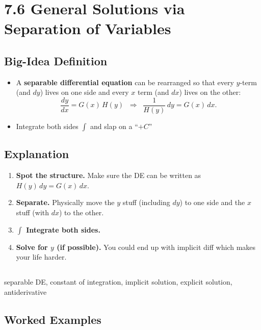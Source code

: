 \documentclass{article}
\begin{document}
\newpage
\section{7.6 General Solutions via Separation of Variables}

\subsection*{Big-Idea Definition}
\begin{itemize}
  \item A \textbf{separable differential equation} can be rearranged so that every \(y\)-term (and \(dy\)) lives on one side and every \(x\) term (and \(dx\)) lives on the other:
  \[
    \frac{dy}{dx}=G(x)\,H(y)
    \;\;\Longrightarrow\;\;
    \frac{1}{H(y)}\,dy = G(x)\,dx.
  \]
  \item Integrate both sides \(\displaystyle\int\) and slap on a “\(+C\)”
\end{itemize}

\subsection*{Explanation}
\begin{enumerate}
  \item \textbf{Spot the structure.}  Make sure the DE can be written as \(H(y)\,dy = G(x)\,dx\). 
  \item \textbf{Separate.}  Physically move the \(y\) stuff (including \(dy\)) to one side and the \(x\) stuff (with \(dx\)) to the other.
  \item \textbf{ \(\displaystyle\int\) Integrate both sides.}
  \item \textbf{Solve for \(y\) (if possible).} You could end up with implicit diff which makes your life harder.
\end{enumerate}

\subsection*{}
separable DE, constant of integration, implicit solution, explicit solution, antiderivative

\subsection*{Worked Examples}
\end{document}
